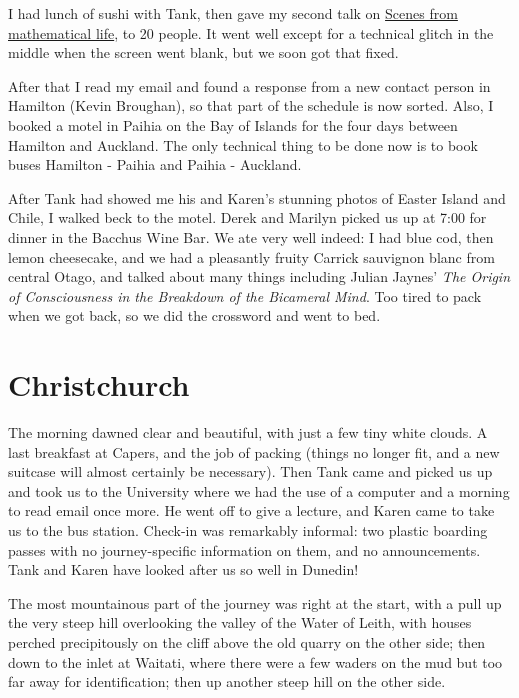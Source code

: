\documentclass[12pt,a4paper]{article}
\begin{document}
I had lunch of sushi with Tank, then gave my second talk on
\href{scenes2.pdf}{Scenes from mathematical life}, to 20 people.
It went well except for a technical glitch in the middle when the screen
went blank, but we soon got that fixed.

After that I read my email and found a response from a new contact person
in Hamilton (Kevin Broughan), so that part of the schedule is now sorted.
Also, I booked a motel in Paihia on the Bay of Islands for the four days
between Hamilton and Auckland. The only technical thing to be done now is 
to book buses Hamilton - Paihia and Paihia - Auckland.

After Tank had showed me his and Karen's stunning photos of Easter Island
and Chile, I walked beck to the motel. Derek and Marilyn picked us up at
7:00 for dinner in the Bacchus Wine Bar. We ate very well indeed: I had
blue cod, then lemon cheesecake, and we had a pleasantly fruity Carrick
sauvignon blanc from central Otago, and talked about many things including
Julian Jaynes' \textit{The Origin of Consciousness in the Breakdown of the 
Bicameral Mind}. Too tired to pack when we got back, so we did the crossword
and went to bed.

\section{Christchurch}

The morning dawned clear and beautiful, with just a few tiny white clouds.
A last breakfast at Capers, and the job of packing (things no longer fit,
and a new suitcase will almost certainly be necessary). Then Tank came and
picked us up and took us to the University where we had the use of a computer
and a morning to read email once more. He went off to give a lecture, and
Karen came to take us to the bus station. Check-in was remarkably informal:
two plastic boarding passes with no journey-specific information on them,
and no announcements. Tank and Karen have looked after us so well in
Dunedin!

The most mountainous part of the journey was right at the start, with a
pull up the very steep hill overlooking the valley of the Water of Leith,
with houses perched precipitously on the cliff above the old quarry on the 
other side; then down to the inlet at Waitati, where there were a few
waders on the mud but too far away for identification; then up another
steep hill on the other side.
\end{document}
